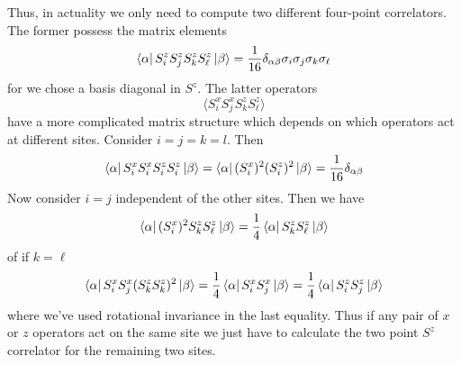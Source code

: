 \documentclass{report}
\begin{document}
Thus, in actuality we only need to compute two 
different four-point correlators. The former possess the matrix elements 
\begin{equation*}
	\bra{\alpha} S_i^z S_j^z S_k^z S_\ell^z \ket{\beta} 
		= \frac{1}{16}\delta_{\alpha\beta}\sigma_i\sigma_j\sigma_k \sigma_\ell
\end{equation*}
for we chose a basis diagonal in $ S^z $. The latter operators 
\begin{equation*}
	\langle S_i^x S_j^x S_k^z S_\ell^z \rangle 
\end{equation*}
have a more complicated matrix structure which depends on which operators act at
different sites. Consider $ i=j=k=l $. Then 
\begin{equation*}
	\bra{\alpha} S_i^x S_i^x S_i^z S_i^z \ket{\beta} = 
	\bra{\alpha} (S_i^x)^2 (S_i^z)^2 \ket{\beta} = \frac{1}{16}\delta_{\alpha\beta}
\end{equation*}
Now consider $ i=j $ independent of the other sites. Then we have 
\begin{equation*}
	\bra{\alpha} (S_i^x)^2 S_k^z S_\ell^z \ket{\beta}
		= \frac{1}{4} \bra{\alpha} S_k^z S_\ell^z \ket{\beta}
\end{equation*}
of if $ k=\ell $
\begin{equation*}
	\bra{\alpha} S_i^x S_j^x (S_k^z S_k^z)^2 \ket{\beta}
		= \frac{1}{4} \bra{\alpha} S_i^x S_j^x\ket{\beta}
		= \frac{1}{4} \bra{\alpha} S_i^z S_j^z\ket{\beta}
\end{equation*}
where we've used rotational invariance in the last equality. Thus if any pair 
of $ x $ or $ z $ operators act on the same site we just have to calculate
the two point $ S^z $ correlator for the remaining two sites. 
\end{document}
